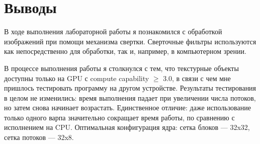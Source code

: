 \section{Выводы}
В ходе выполнения лабораторной работы я познакомился с обработкой изображений при помощи механизма свертки. Сверточные фильтры используются как непосредственно для обработки, так и, например, в компьютерном зрении.

В процессе выполнения работы я столкнулся с тем, что текстурные объекты доступны только на GPU с compute capability $\geqslant$ 3.0, в связи с чем мне пришлось тестировать программу на другом устройстве. Результаты тестирования в целом не изменились: время выполнения падает при увеличении числа потоков, но затем снова начинает возрастать. Единственное отличие: даже использование только одного варпа значительно сокращает время работы, по сравнению с исполнением на CPU. Оптимальная конфигурация ядра: сетка блоков --- 32x32, сетка потоков --- 32x8.
\pagebreak

